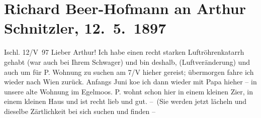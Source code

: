

         
         \renewcommand{\erwaehntePersonen}{Personen: Richard Beer-Hofmann, Paula Beer-Hofmann, Paul Goldmann, Markus Hajek, Alois Hofmann, Louise Schnitzler}
         \renewcommand{\erwaehnteOrte}{Orte: Bad Ischl, Eglmoosgasse, Paris, Wien}
         \renewcommand{\erwaehnteWerke}{}
               \section[Richard Beer-Hofmann an Arthur Schnitzler, 12. 5. 1897]{ Richard Beer-Hofmann an Arthur Schnitzler, 12. 5. 1897}\nopagebreak{}\rehead{ }\begin{ledgroupsized}[t]{13cm}\normalsize\beginnumbering \toendnotes[C]{\smallbreak\pagebreak[2]} 
\toendnotes[C]{\smallbreak}\pstart
           \centering{}{\pb}Ischl. 12/V 97\pend
           \pstart
           Lieber Arthur! Ich habe einen recht starken Luftröhrenkatarrh gehabt
               (war auch bei Ihrem Schwager) und bin deshalb,
               (Luftveränderung) und auch um für P. Wohnung
               zu suchen am 7/V hieher gereist; übermorgen fahre ich wieder nach Wien zurück. Anfangs Juni ko{\geminationm}e {\pb}ich dann wieder mit Papa
               hieher – in unsere alte Wohnung im Egelmoos. P. wohnt schon hier in einem kleinen Zi{\geminationm}er, in einem kleinen Haus und ist recht lieb und gut.
               – (Sie werden jetzt lächeln und dieselbe Zärtlichkeit bei sich suchen und finden –

\end{ledgroupsized}
